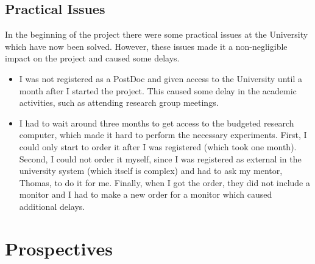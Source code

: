 \documentclass[12pt,a4paper]{article}
\begin{document}
\subsection{Practical Issues}
In the beginning of the project there were some practical issues at the
University which have now been solved. However, these issues made it a
non-negligible impact on the project and caused some delays.
\begin{itemize}
\item I was not registered as a PostDoc and given access to the University until
  a month after I started the project. This caused some delay in the academic
  activities, such as attending research group meetings.
\item I had to wait around three months to get access to the budgeted research
  computer, which made it hard to perform the necessary experiments. First, I
  could only start to order it after I was registered (which took one month).
  Second, I could not order it myself, since I was registered as external in the
  university system (which itself is complex) and had to ask my mentor, Thomas,
  to do it for me. Finally, when I got the order, they did not include a monitor
  and I had to make a new order for a monitor which caused additional delays.
\end{itemize}

\section{Prospectives}

\medskip

\printbibliography[
heading=bibintoc,
title={Bibliography}
] 

\clearpage
\end{document}
